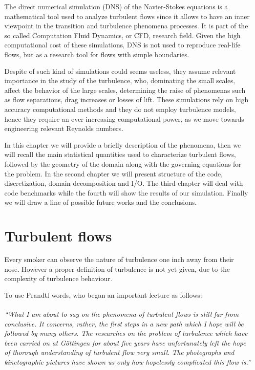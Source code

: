 The direct numerical simulation (DNS) of the Navier-Stokes equations is a mathematical tool used to analyze turbulent flows since it allows to have an inner viewpoint in the transition and turbulence phenomena processes. It is part of the so called Computation Fluid Dynamics, or CFD, research field. 
Given the high computational cost of these simulations, DNS is not used to reproduce real-life flows, but as a research tool for flows with simple boundaries\cite{dns:tool}. \par
Despite of such kind of simulations could seems useless, they assume relevant importance in the study of the turbulence, who, dominating the small scales, affect the behavior of the large scales, determining the raise of phenomenas such as flow separations, drag increases or losses of lift.
These simulations rely on high accuracy computational methods and they do not employ turbulence models, hence they require an ever-increasing computational power, as we move towards engineering relevant Reynolds numbers.
\par
In this chapter we will provide a briefly description of the phenomena, then we will recall the main statistical quantities used to characterize turbulent flows, followed by the geometry of the domain along with the governing equations for the problem. In the second chapter we will present structure of the code, discretization, domain decomposition and I/O.
The third chapter will deal with code benchmarks while the fourth will show the results of our simulation. Finally we will draw a line of possible future works and the conclusions.

\section{Turbulent flows}
Every smoker can observe the nature of turbulence one inch away from their nose.
However a proper definition of turbulence is not yet given, due to the complexity of turbulence behaviour. \par
To use Prandtl words, who began an important lecture as follows: \\~\\
\emph{``What I am about to say on the phenomena of turbulent flows is still far from conclusive. It concerns, rather, the first steps in a new path which I hope will be followed by many others. The researches on the problem of turbulence which have been carried on at G\"{o}ttingen for about five years have unfortunately left the hope of thorough understanding of turbulent flow very small. The photographs and kinetographic pictures have shown us only how hopelessly complicated this flow is.''} \\~\\

